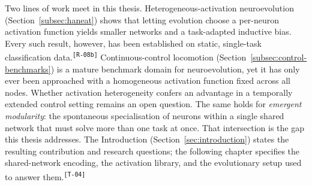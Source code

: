 \documentclass[12pt]{article}
\newcommand{\revID}[1]{\textsuperscript{\scriptsize\texttt{[#1]}}}
\newcommand{\revRepeat}[2]{\textcolor{revTeal}{#2}\revID{#1}}
\newcommand{\revStructure}[2]{\textcolor{revAmber}{#2}\revID{#1}}
\begin{document}
Two lines of work meet in this thesis.
Heterogeneous-activation neuroevolution (Section~\ref{subsec:haneat}) shows that letting evolution choose a per-neuron activation function yields smaller networks and a task-adapted inductive bias.
\revRepeat{R-08b}{Every such result, however, has been established on static, single-task classification data.}
Continuous-control locomotion (Section~\ref{subsec:control-benchmarks}) is a mature benchmark domain for neuroevolution, yet it has only ever been approached with a homogeneous activation function fixed across all nodes.
Whether activation heterogeneity confers an advantage in a temporally extended control setting remains an open question.
The same holds for \emph{emergent modularity}: the spontaneous specialisation of neurons within a single shared network that must solve more than one task at once.
That intersection is the gap this thesis addresses.
\revStructure{T-04}{The Introduction (Section~\ref{sec:introduction}) states the resulting contribution and research questions; the following chapter specifies the shared-network encoding, the activation library, and the evolutionary setup used to answer them.}





\end{document}
